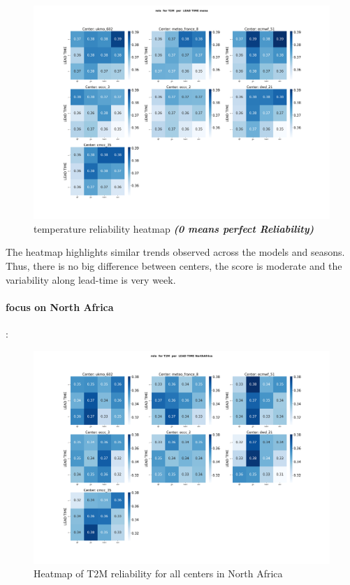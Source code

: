 \begin{figure}[H]
    \centering
    \includegraphics[width=1\linewidth]{plots/prob/rela/rela_T2M_mena.png}
    \caption{temperature reliability heatmap \textbf{\textit{(0 means perfect Reliability)}}}
\end{figure}


The heatmap highlights similar trends observed across the models and seasons. Thus, there is no big difference between centers, the score is moderate and the variability along lead-time is very week.


\paragraph{focus on North Africa}:
\begin{figure}[H]
\includegraphics[scale=0.3]{plots/prob/rela/rela_T2M_NorthAfrica.png}

\caption{Heatmap of T2M  reliability  for all centers in North Africa}
\end{figure}


